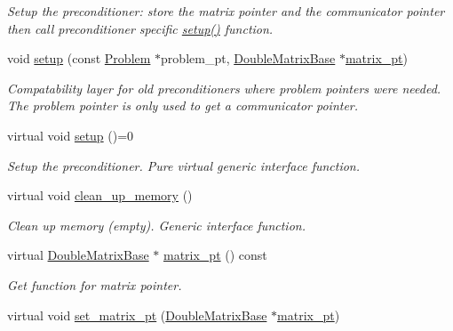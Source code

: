 \begin{DoxyCompactItemize}
\begin{DoxyCompactList}\small\item\em Setup the preconditioner\+: store the matrix pointer and the communicator pointer then call preconditioner specific \hyperlink{classoomph_1_1Preconditioner_af4886f4efe510e5c9b0eb19422943588}{setup()} function. \end{DoxyCompactList}\item 
void \hyperlink{classoomph_1_1Preconditioner_a783fae97e4b898f8de72b504a4f4bec6}{setup} (const \hyperlink{classoomph_1_1Problem}{Problem} $\ast$problem\+\_\+pt, \hyperlink{classoomph_1_1DoubleMatrixBase}{Double\+Matrix\+Base} $\ast$\hyperlink{classoomph_1_1Preconditioner_a66726e9df31365df646cdf83a975aa26}{matrix\+\_\+pt})
\begin{DoxyCompactList}\small\item\em Compatability layer for old preconditioners where problem pointers were needed. The problem pointer is only used to get a communicator pointer. \end{DoxyCompactList}\item 
virtual void \hyperlink{classoomph_1_1Preconditioner_af4886f4efe510e5c9b0eb19422943588}{setup} ()=0
\begin{DoxyCompactList}\small\item\em Setup the preconditioner. Pure virtual generic interface function. \end{DoxyCompactList}\item 
virtual void \hyperlink{classoomph_1_1Preconditioner_a46c31c416829bedcd9db238431262027}{clean\+\_\+up\+\_\+memory} ()
\begin{DoxyCompactList}\small\item\em Clean up memory (empty). Generic interface function. \end{DoxyCompactList}\item 
virtual \hyperlink{classoomph_1_1DoubleMatrixBase}{Double\+Matrix\+Base} $\ast$ \hyperlink{classoomph_1_1Preconditioner_a66726e9df31365df646cdf83a975aa26}{matrix\+\_\+pt} () const
\begin{DoxyCompactList}\small\item\em Get function for matrix pointer. \end{DoxyCompactList}\item 
virtual void \hyperlink{classoomph_1_1Preconditioner_af459b7333c4c64435fd8fa933535901f}{set\+\_\+matrix\+\_\+pt} (\hyperlink{classoomph_1_1DoubleMatrixBase}{Double\+Matrix\+Base} $\ast$\hyperlink{classoomph_1_1Preconditioner_a66726e9df31365df646cdf83a975aa26}{matrix\+\_\+pt})

\end{DoxyCompactItemize}
